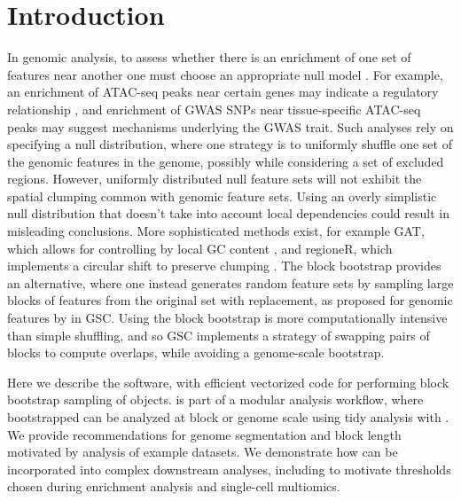\section{Introduction}

In genomic analysis, to assess whether
there is an enrichment of one set of features near another 
one must choose an appropriate null model \citep{reviewdilemma2014}.
For example, an enrichment of ATAC-seq peaks near certain genes
may indicate a regulatory relationship \citep{lee2020fluent}, 
and enrichment of GWAS SNPs near tissue-specific ATAC-seq peaks may
suggest mechanisms underlying the GWAS trait.
Such analyses rely on specifying a null distribution, where one
strategy is to uniformly shuffle one set of the
genomic features in the genome, possibly while considering a set of
excluded regions.
However, uniformly distributed null feature sets will not exhibit the
spatial clumping common with genomic feature sets.
Using an overly simplistic null distribution that doesn't take into
account local dependencies could result in misleading conclusions.
More sophisticated methods exist, for example
GAT, which allows for controlling by local GC content
\citep{GAT_2013}, and regioneR, which implements a circular shift to
preserve clumping \citep{gel2016regioner}.
The block bootstrap \citep{politis1999subsampling}
provides an alternative, where one instead generates
random feature sets by sampling large blocks of features from the
original set with replacement, as proposed for 
genomic features by \citet{bickel2010subsampling} in GSC.
Using the block bootstrap is more
computationally intensive than simple shuffling, and so GSC implements
a strategy of swapping pairs of blocks to compute overlaps, while
avoiding a genome-scale bootstrap.

Here we describe the \bootranges software, with efficient
vectorized code for performing block bootstrap sampling of
\granges \citep{lawrence2013software} objects.
\bootranges is part of a modular analysis workflow, where bootstrapped
\granges can be analyzed at block or genome scale using tidy
analysis with \plyranges \citep{lee2019plyranges}.
We provide recommendations for genome segmentation and block length
motivated by analysis of example datasets.
We demonstrate how \bootranges can be incorporated into complex
downstream analyses, including to motivate thresholds chosen during
enrichment analysis and single-cell multiomics.

